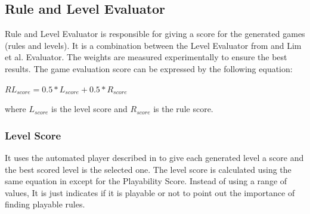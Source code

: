 \subsection{Rule and Level Evaluator}
Rule and Level Evaluator is responsible for giving a score for the generated games (rules and levels). It is a combination between the Level Evaluator from  and Lim et al.\cite{puzzleScriptGeneration} Evaluator. The weights are measured experimentally to ensure the best results. The game evaluation score can be expressed by the following equation:
\begin{center}
$RL_{score} = 0.5 * L_{score} + 0.5 * R_{score}$
\end{center}
where $L_{score}$ is the level score and $R_{score}$ is the rule score.

\subsubsection{Level Score}
It uses the automated player described in  to give each generated level a score and the best scored level is the selected one. The level score is calculated using the same equation in  except for the Playability Score. Instead of using a range of values, It is just indicates if it is playable or not to point out the importance of finding playable rules.

